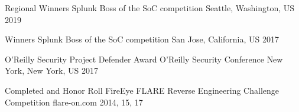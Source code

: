

\begin{cvhonors}


\cvhonor
{Regional Winners} %
{Splunk Boss of the SoC competition} %
{Seattle, Washington, US} %
{2019} %

\cvhonor
{Winners} %
{Splunk Boss of the SoC competition} %
{San Jose, California, US} %
{2017} %


\cvhonor
{O'Reilly Security Project Defender Award} %
{O'Reilly Security Conference} %
{New York, New York, US} %
{2017} %


\cvhonor
{Completed and Honor Roll} %
{FireEye FLARE Reverse Engineering Challenge Competition} %
{flare-on.com} %
{2014, 15, 17} %


\end{cvhonors}
